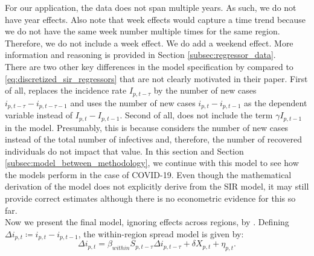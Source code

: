 \documentclass[12pt]{article}
\begin{document}
	For our application, the data does not span multiple years. As such, we do not have year effects. Also note that week effects would capture a time trend because we do not have the same week number multiple times for the same region. Therefore, we do not include a week effect. We do add a weekend effect. More information and reasoning is provided in Section \ref{subsec:regressor_data}. \\
	
	There are two other key differences in the model specification by \textcite{adda2016economic} compared to \eqref{eq:discretized_sir_regressors} that are not clearly motivated in their paper. First of all, \textcite{adda2016economic} replaces the incidence rate $I_{p,t-\tau}$ by the number of new cases $i_{p,t-\tau} - i_{p,t-\tau-1}$ and uses the number of new cases $i_{p,t} - i_{p,t-1}$ as the dependent variable instead of $I_{p,t} - I_{p,t-1}$. Second of all, \textcite{adda2016economic} does not include the term $\gamma I_{p,t-1}$ in the model. Presumably, this is because \textcite{adda2016economic} considers the number of new cases instead of the total number of infectives and, therefore, the number of recovered individuals do not impact that value. In this section and Section \ref{subsec:model_between_methodology}, we continue with this model to see how the models perform in the case of COVID-19. Even though the mathematical derivation of the model does not explicitly derive from the SIR model, it may still provide correct estimates although there is no econometric evidence for this so far. \\
	
	Now we present the final model, ignoring effects across regions, by \textcite{adda2016economic}. Defining $\Delta i_{p,t} \coloneqq i_{p,t} - i_{p,t-1}$, the within-region spread model is given by:
	\begin{equation} \label{eq:model_within}
	    \Delta i_{p,t} = \beta_{within}S_{p,t-\tau}\Delta i_{p,t-\tau} + \delta X_{p,t} + \eta_{p,t}.
	\end{equation}
	
\end{document}
